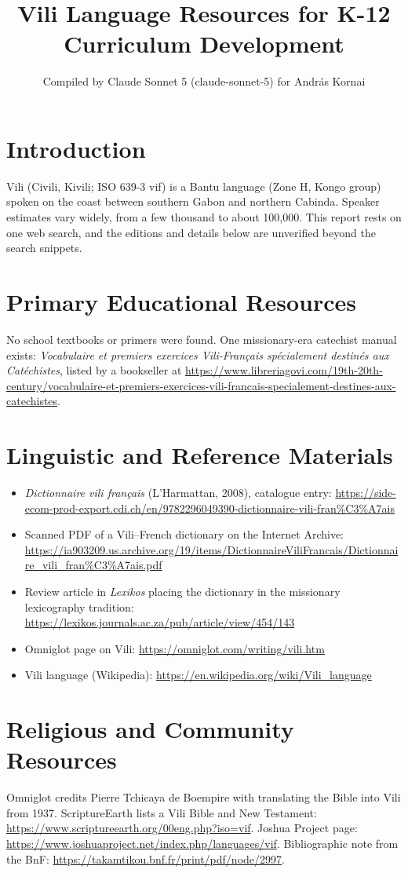 \documentclass[12pt]{article}
\title{Vili Language Resources for K-12 Curriculum Development}
\author{Compiled by Claude Sonnet 5 (claude-sonnet-5) for Andr\'as Kornai}
\date{}
\begin{document}
\maketitle

\section{Introduction}
Vili (Civili, Kivili; ISO 639-3 vif) is a Bantu language (Zone H, Kongo group) spoken on the coast between southern Gabon and northern Cabinda. Speaker estimates vary widely, from a few thousand to about 100,000. This report rests on one web search, and the editions and details below are unverified beyond the search snippets.

\section{Primary Educational Resources}
No school textbooks or primers were found. One missionary-era catechist manual exists: \emph{Vocabulaire et premiers exercices Vili-Fran\c{c}ais sp\'ecialement destin\'es aux Cat\'echistes}, listed by a bookseller at \url{https://www.libreriagovi.com/19th-20th-century/vocabulaire-et-premiers-exercices-vili-francais-specialement-destines-aux-catechistes}.

\section{Linguistic and Reference Materials}
\begin{itemize}
\item \emph{Dictionnaire vili fran\c{c}ais} (L'Harmattan, 2008), catalogue entry: \url{https://side-ecom-prod-export.cdi.ch/en/9782296049390-dictionnaire-vili-fran%C3%A7ais}
\item Scanned PDF of a Vili--French dictionary on the Internet Archive: \url{https://ia903209.us.archive.org/19/items/DictionnaireViliFrancais/Dictionnaire_vili_fran%C3%A7ais.pdf}
\item Review article in \emph{Lexikos} placing the dictionary in the missionary lexicography tradition: \url{https://lexikos.journals.ac.za/pub/article/view/454/143}
\item Omniglot page on Vili: \url{https://omniglot.com/writing/vili.htm}
\item Vili language (Wikipedia): \url{https://en.wikipedia.org/wiki/Vili_language}
\end{itemize}

\section{Religious and Community Resources}
Omniglot credits Pierre Tchicaya de Boempire with translating the Bible into Vili from 1937. ScriptureEarth lists a Vili Bible and New Testament: \url{https://www.scriptureearth.org/00eng.php?iso=vif}. Joshua Project page: \url{https://www.joshuaproject.net/index.php/languages/vif}. Bibliographic note from the BnF: \url{https://takamtikou.bnf.fr/print/pdf/node/2997}.
\end{document}
